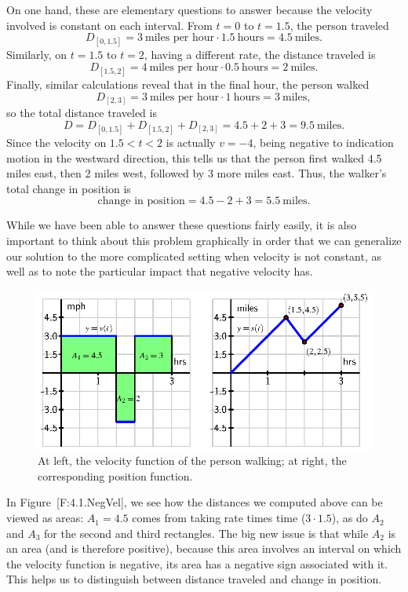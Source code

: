 On one hand, these are elementary questions to answer because the
velocity involved is constant on each interval. From \(t = 0\) to
\(t = 1.5\), the person traveled
\[D_{[0,1.5]} = 3 \ \mbox{miles per hour} \cdot 1.5 \ \mbox{hours} = 4.5 \ \mbox{miles}.\]
Similarly, on \(t = 1.5\) to \(t = 2\), having a different rate, the
distance traveled is
\[D_{[1.5,2]} = 4 \ \mbox{miles per hour} \cdot 0.5 \ \mbox{hours} = 2 \ \mbox{miles}.\]
Finally, similar calculations reveal that in the final hour, the person
walked
\[D_{[2,3]} = 3 \ \mbox{miles per hour} \cdot 1 \ \mbox{hours} = 3 \ \mbox{miles},\]
so the total distance traveled is
\[D = D_{[0,1.5]} + D_{[1.5,2]} + D_{[2,3]} = 4.5 + 2 + 3 = 9.5 \ \mbox{miles}.\]
Since the velocity on \(1.5 < t < 2\) is actually \(v = -4\), being
negative to indication motion in the westward direction, this tells us
that the person first walked 4.5 miles east, then 2 miles west, followed
by 3 more miles east. Thus, the walker's total change in position is
\[\mbox{change in position} = 4.5 - 2 + 3 = 5.5 \ \mbox{miles}.\]

While we have been able to answer these questions fairly easily, it is
also important to think about this problem graphically in order that we
can generalize our solution to the more complicated setting when
velocity is not constant, as well as to note the particular impact that
negative velocity has.

\begin{figure}[htbp]
\centering
\includegraphics{figures/4_1_NegVel.eps}
\caption{At left, the velocity function of the person walking; at right,
the corresponding position function.{}}
\end{figure}

In Figure~{[}F:4.1.NegVel{]}, we see how the distances we computed above
can be viewed as areas: \(A_1 = 4.5\) comes from taking rate times time
(\(3 \cdot 1.5\)), as do \(A_2\) and \(A_3\) for the second and third
rectangles. The big new issue is that while \(A_2\) is an area (and is
therefore positive), because this area involves an interval on which the
velocity function is negative, its area has a negative sign associated
with it. This helps us to distinguish between distance traveled and
change in position.

